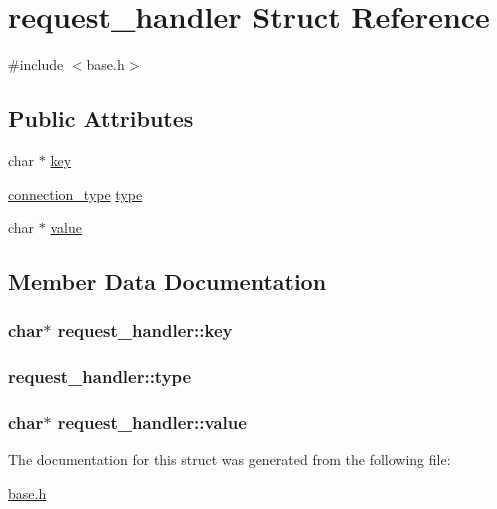 \hypertarget{structrequest__handler}{\section{request\-\_\-handler Struct Reference}
\label{structrequest__handler}
}


{\ttfamily \#include $<$base.\-h$>$}

\subsection*{Public Attributes}
\begin{DoxyCompactItemize}
\item 
char $\ast$ \hyperlink{structrequest__handler_a0294a12cb00d9b6dfda22f6717200845}{key}
\item 
\hyperlink{base_8h_acdf0efffcd30d2dd47aa36b78d3398a7}{connection\-\_\-type} \hyperlink{structrequest__handler_ab917b365ae71093bc868d3b903691044}{type}
\item 
char $\ast$ \hyperlink{structrequest__handler_a6d6f68f3271af4d8a36c75a54ef63d19}{value}
\end{DoxyCompactItemize}


\subsection{Member Data Documentation}
\hypertarget{structrequest__handler_a0294a12cb00d9b6dfda22f6717200845}{
\subsubsection[{key}]{\setlength{\rightskip}{0pt plus 5cm}char$\ast$ request\-\_\-handler\-::key}}\label{structrequest__handler_a0294a12cb00d9b6dfda22f6717200845}
\hypertarget{structrequest__handler_ab917b365ae71093bc868d3b903691044}{
\subsubsection[{type}]{ request\-\_\-handler\-::type}}\label{structrequest__handler_ab917b365ae71093bc868d3b903691044}
\hypertarget{structrequest__handler_a6d6f68f3271af4d8a36c75a54ef63d19}{
\subsubsection[{value}]{\setlength{\rightskip}{0pt plus 5cm}char$\ast$ request\-\_\-handler\-::value}}\label{structrequest__handler_a6d6f68f3271af4d8a36c75a54ef63d19}


The documentation for this struct was generated from the following file\-:\begin{DoxyCompactItemize}
\item 
\hyperlink{base_8h}{base.\-h}\end{DoxyCompactItemize}
